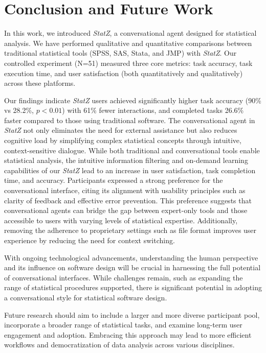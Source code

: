 \documentclass{article}
\begin{document}
\section{Conclusion and Future Work}
In this work, we introduced \textit{StatZ}, a conversational agent designed for statistical analysis. We have performed qualitative and quantitative comparisons between traditional statistical tools (SPSS, SAS, Stata, and JMP) with \textit{StatZ}. Our controlled experiment (N=51) measured three core metrics: task accuracy, task execution time, and user satisfaction (both quantitatively and qualitatively) across these platforms.  

Our findings indicate \textit{StatZ} users achieved significantly higher task accuracy (90\% vs 28.2\%, $p<0.01$) with 61\% fewer interactions, and completed tasks 26.6\% faster compared to those using traditional software. The conversational agent in \textit{StatZ} not only eliminates the need for external assistance but also reduces cognitive load by simplifying complex statistical concepts through intuitive, context-sensitive dialogue. While both traditional and conversational tools enable statistical analysis, the intuitive information filtering and on-demand learning capabilities of our \textit{StatZ} lead to an increase in user satisfaction, task completion time, and accuracy. Participants expressed a strong preference for the conversational interface, citing its alignment with usability principles such as clarity of feedback and effective error prevention. This preference suggests that conversational agents can bridge the gap between expert-only tools and those accessible to users with varying levels of statistical expertise. Additionally, removing the adherence to proprietary settings such as file format improves user experience by reducing the need for context switching. 

With ongoing technological advancements, understanding the human perspective and its influence on software design will be crucial in harnessing the full potential of conversational interfaces. While challenges remain, such as expanding the range of statistical procedures supported, there is significant potential in adopting a conversational style for statistical software design.

Future research should aim to include a larger and more diverse participant pool, incorporate a broader range of statistical tasks, and examine long-term user engagement and adoption. Embracing this approach may lead to more efficient workflows and democratization of data analysis across various disciplines.
\end{document}
